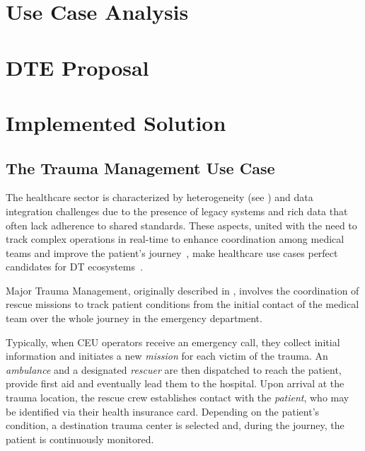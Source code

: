 \section{Use Case Analysis}

\section{\acl{DTE} Proposal}

\section{Implemented Solution}

\subsection{The Trauma Management Use Case}

The healthcare sector is characterized by heterogeneity (see ) and data integration challenges due to the presence of legacy systems and rich data that often lack adherence to shared standards.
These aspects, united with the need to track complex operations in real-time to enhance coordination among medical teams and improve the patient's journey~\cite{croatti2020jms,ricci2022dthealthcare}, make healthcare use cases perfect candidates for \ac{DT} ecosystems~\cite{10178878}.

Major Trauma Management, originally described in \cite{ricci2022wodt}, involves the coordination of rescue missions to track patient conditions from the initial contact of the medical team over the whole journey in the emergency department.

Typically, when \ac{CEU} operators receive an emergency call, they collect initial information and initiates a new \emph{mission} for each victim of the trauma.
An \emph{ambulance} and a designated \emph{rescuer} are then dispatched to reach the patient, provide first aid and eventually lead them to the hospital.
%
Upon arrival at the trauma location, the rescue crew establishes contact with the \emph{patient}, who may be identified via their health insurance card.
Depending on the patient's condition, a destination trauma center is selected and, during the journey, the patient is continuously monitored.

